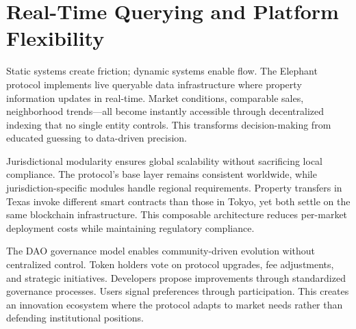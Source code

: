 \section{Real-Time Querying and Platform Flexibility}

Static systems create friction; dynamic systems enable flow. The Elephant protocol implements live queryable data infrastructure where property information updates in real-time. Market conditions, comparable sales, neighborhood trends—all become instantly accessible through decentralized indexing that no single entity controls. This transforms decision-making from educated guessing to data-driven precision.

Jurisdictional modularity ensures global scalability without sacrificing local compliance. The protocol's base layer remains consistent worldwide, while jurisdiction-specific modules handle regional requirements. Property transfers in Texas invoke different smart contracts than those in Tokyo, yet both settle on the same blockchain infrastructure. This composable architecture reduces per-market deployment costs while maintaining regulatory compliance.

The DAO governance model enables community-driven evolution without centralized control. Token holders vote on protocol upgrades, fee adjustments, and strategic initiatives. Developers propose improvements through standardized governance processes. Users signal preferences through participation. This creates an innovation ecosystem where the protocol adapts to market needs rather than defending institutional positions.

